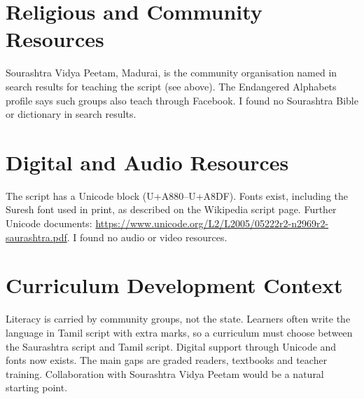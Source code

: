 \documentclass[12pt]{article}
\begin{document}
\section{Religious and Community Resources}
Sourashtra Vidya Peetam, Madurai, is the community organisation named in search results for teaching the script (see above). The Endangered Alphabets profile says such groups also teach through Facebook. I found no Sourashtra Bible or dictionary in search results.

\section{Digital and Audio Resources}
The script has a Unicode block (U+A880--U+A8DF). Fonts exist, including the Suresh font used in print, as described on the Wikipedia script page. Further Unicode documents: \url{https://www.unicode.org/L2/L2005/05222r2-n2969r2-saurashtra.pdf}. I found no audio or video resources.

\section{Curriculum Development Context}
Literacy is carried by community groups, not the state. Learners often write the language in Tamil script with extra marks, so a curriculum must choose between the Saurashtra script and Tamil script. Digital support through Unicode and fonts now exists. The main gaps are graded readers, textbooks and teacher training. Collaboration with Sourashtra Vidya Peetam would be a natural starting point.
\end{document}
